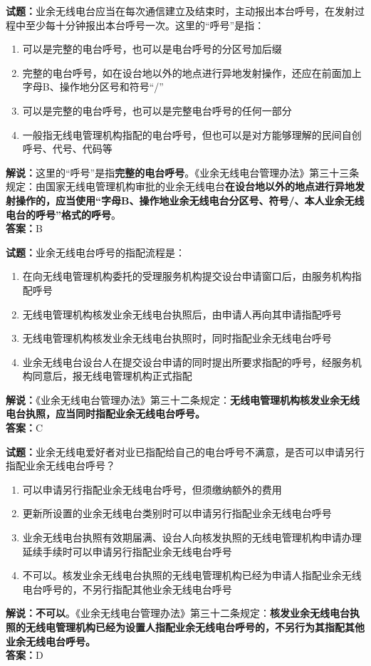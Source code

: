 \documentclass{ctexbook}
\begin{document}
\noindent\textbf{试题：}业余无线电台应当在每次通信建立及结束时，主动报出本台呼号，在发射过程中至少每十分钟报出本台呼号一次。这里的“呼号”是指：
\begin{enumerate}[leftmargin=3em]
  \item 可以是完整的电台呼号，也可以是电台呼号的分区号加后缀
  \item 完整的电台呼号，如在设台地以外的地点进行异地发射操作，还应在前面加上字母B、操作地分区号和符号“/”
  \item 可以是完整的电台呼号，也可以是完整电台呼号的任何一部分
  \item 一般指无线电管理机构指配的电台呼号，但也可以是对方能够理解的民间自创呼号、代号、代码等
\end{enumerate}
\noindent\textbf{解说：}这里的“呼号”是指\textbf{完整的电台呼号}。《业余无线电台管理办法》第三十三条规定：由国家无线电管理机构审批的业余无线电台\textbf{在设台地以外的地点进行异地发射操作的，应当使用“字母B、操作地业余无线电台分区号、符号/、本人业余无线电台的呼号”格式的呼号}。\\\noindent\textbf{答案：}B

\vspace{\baselineskip}

\noindent\textbf{试题：}业余无线电台呼号的指配流程是：
\begin{enumerate}[leftmargin=3em]
  \item 在向无线电管理机构委托的受理服务机构提交设台申请窗口后，由服务机构指配呼号
  \item 无线电管理机构核发业余无线电台执照后，由申请人再向其申请指配呼号
  \item 无线电管理机构核发业余无线电台执照时，同时指配业余无线电台呼号
  \item 业余无线电台设台人在提交设台申请的同时提出所要求指配的呼号，经服务机构同意后，报无线电管理机构正式指配
\end{enumerate}
\noindent\textbf{解说：}《业余无线电台管理办法》第三十二条规定：\textbf{无线电管理机构核发业余无线电台执照，应当同时指配业余无线电台呼号。}\\\noindent\textbf{答案：}C

\vspace{\baselineskip}

\noindent\textbf{试题：}业余无线电爱好者对业已指配给自己的电台呼号不满意，是否可以申请另行指配业余无线电台呼号？
\begin{enumerate}[leftmargin=3em]
  \item 可以申请另行指配业余无线电台呼号，但须缴纳额外的费用
  \item 更新所设置的业余无线电台类别时可以申请另行指配业余无线电台呼号
  \item 业余无线电台执照有效期届满、设台人向核发执照的无线电管理机构申请办理延续手续时可以申请另行指配业余无线电台呼号
  \item 不可以。核发业余无线电台执照的无线电管理机构已经为申请人指配业余无线电台呼号的，不另行指配其他业余无线电台呼号
\end{enumerate}
\textbf{解说：不可以}。《业余无线电台管理办法》第三十二条规定：\textbf{核发业余无线电台执照的无线电管理机构已经为设置人指配业余无线电台呼号的，不另行为其指配其他业余无线电台呼号。}\\\noindent\textbf{答案：}D
\end{document}
